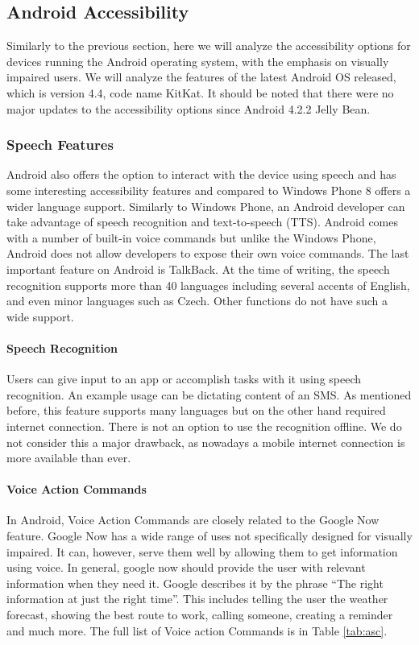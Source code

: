 
\subsection{Android Accessibility}
Similarly to the previous section, here we will analyze the accessibility options for devices running the Android operating system, with the emphasis on visually impaired users. We will analyze the features of the latest Android OS released, which is version 4.4, code name KitKat. It should be noted that there were no major updates to the accessibility options since Android 4.2.2 Jelly Bean.

\subsubsection{Speech Features}
Android also offers the option to interact with the device using speech and has some interesting accessibility features and compared to Windows Phone 8 offers a wider language support. Similarly to Windows Phone, an Android developer can take advantage of speech recognition and text-to-speech (TTS). Android comes with a number of built-in voice commands but unlike the Windows Phone, Android does not allow developers to expose their own voice commands. The last important feature on Android is TalkBack.
At the time of writing, the speech recognition supports more than 40 languages including several accents of English, and even minor languages such as Czech. Other functions do not have such a wide support. 
\paragraph{Speech Recognition}
Users can give input to an app or accomplish tasks with it using speech recognition. An example usage can be dictating content of an SMS. As mentioned before, this feature supports many languages but on the other hand required internet connection. There is not an option to use the recognition offline. We do not consider this a major drawback, as nowadays a mobile internet connection is more available than ever.
\paragraph{Voice Action Commands}
In Android, Voice Action Commands are closely related to the Google Now feature. Google Now has a wide range of uses not specifically designed for visually impaired. It can, however, serve them well by allowing them to get information using voice.
In general, google now should provide the user with relevant information when they need it. Google describes it by the phrase “The right information at just the right time”. This includes telling the user the weather forecast, showing the best route to work, calling someone, creating a reminder and much more. The full list of Voice action Commands is in Table \ref{tab:asc}.

